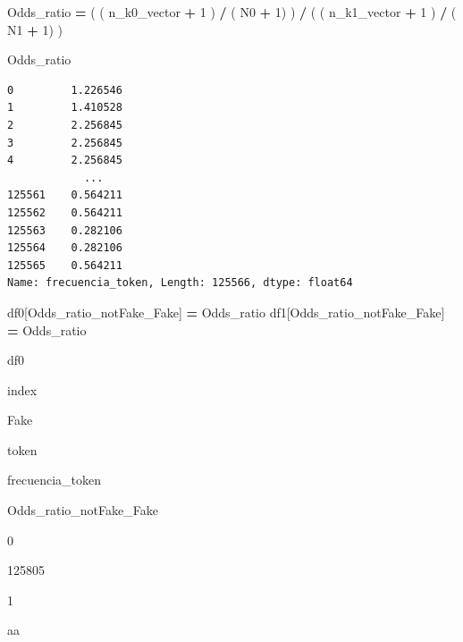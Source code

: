 \documentclass[
  11pt,
  a4paper,
]{article}
\newenvironment{Shaded}{\begin{snugshade}}{\end{snugshade}}
\newcommand{\DecValTok}[1]{\textcolor[rgb]{0.00,0.00,0.81}{#1}}
\newcommand{\NormalTok}[1]{#1}
\newcommand{\OperatorTok}[1]{\textcolor[rgb]{0.81,0.36,0.00}{\textbf{#1}}}
\newcommand{\StringTok}[1]{\textcolor[rgb]{0.31,0.60,0.02}{#1}}
\begin{document}
\begin{Shaded}
\begin{Highlighting}[]
\NormalTok{Odds\_ratio }\OperatorTok{=}\NormalTok{ ( ( n\_k0\_vector }\OperatorTok{+} \DecValTok{1}\NormalTok{ ) }\OperatorTok{/}\NormalTok{ ( N0 }\OperatorTok{+} \DecValTok{1}\NormalTok{) ) }\OperatorTok{/}\NormalTok{ ( ( n\_k1\_vector }\OperatorTok{+} \DecValTok{1}\NormalTok{ ) }\OperatorTok{/}\NormalTok{ ( N1 }\OperatorTok{+} \DecValTok{1}\NormalTok{) )}
\end{Highlighting}
\end{Shaded}

\begin{Shaded}
\begin{Highlighting}[]
\NormalTok{Odds\_ratio}
\end{Highlighting}
\end{Shaded}

\begin{verbatim}
0         1.226546
1         1.410528
2         2.256845
3         2.256845
4         2.256845
            ...   
125561    0.564211
125562    0.564211
125563    0.282106
125564    0.282106
125565    0.564211
Name: frecuencia_token, Length: 125566, dtype: float64
\end{verbatim}

\begin{Shaded}
\begin{Highlighting}[]
\NormalTok{df0[}\StringTok{\textquotesingle{}Odds\_ratio\_notFake\_Fake\textquotesingle{}}\NormalTok{] }\OperatorTok{=}\NormalTok{ Odds\_ratio  }
\NormalTok{df1[}\StringTok{\textquotesingle{}Odds\_ratio\_notFake\_Fake\textquotesingle{}}\NormalTok{] }\OperatorTok{=}\NormalTok{ Odds\_ratio  }
\end{Highlighting}
\end{Shaded}

\begin{Shaded}
\begin{Highlighting}[]
\NormalTok{df0}
\end{Highlighting}
\end{Shaded}

index

Fake

token

frecuencia\_token

Odds\_ratio\_notFake\_Fake

0

125805

1

aa
\end{document}
